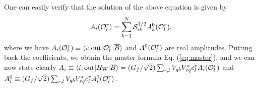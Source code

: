 \documentclass[aps,preprint,floats,epsf,epsfig,nofootinbib,letter]{revtex4}
\newcommand{\be}{\begin{eqnarray}}
\newcommand{\en}{\end{eqnarray}}
\newcommand{\ov}{\overline}
\newcommand{\Sc}{{\cal S}}
\begin{document}
One can easily verify that the solution of the above equation is given by
 \be
 A_i({\cal O}^r_l)=\sum_{k=1}^N\Sc^{1/2}_{ik} A^0_k({\cal O}^r_l),
 \label{eq:master0}
 \en
where we have $A_i({\cal O}^r_l)\equiv \langle i;{\rm out}|{\cal O}^r_l|\overline B\rangle $ and $A^0({\cal O}^r_l)$ are real amplitudes.
Putting back the coefficients, we obtain the master formula Eq. (\ref{eq:master}),
and we can now state clearly $A_i\equiv \langle i;{\rm out}|H_{\rm W}|\overline B\rangle=
 (G_f/\sqrt2) \sum_{r,l}V_{qb}V^*_{rq} c^r_lA_i({\cal O}^r_l)$ and $A^0_i\equiv
 (G_f/\sqrt2) \sum_{r,l}V_{qb}V^*_{rq} c^r_lA^0_i({\cal O}^r_l)$.





\end{document}
